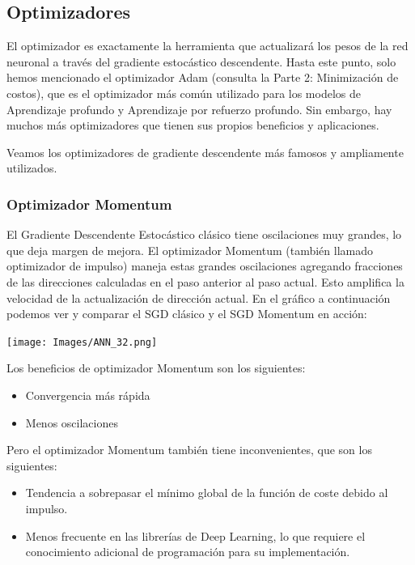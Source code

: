 \documentclass[
]{book}
\providecommand{\tightlist}{%
  \setlength{\itemsep}{0pt}\setlength{\parskip}{0pt}}
\begin{document}
\hypertarget{optimizadores}{%
\subsection{Optimizadores}\label{optimizadores}}

El optimizador es exactamente la herramienta que actualizará los pesos de la red neuronal a través del gradiente estocástico descendente. Hasta este punto, solo hemos mencionado el optimizador Adam (consulta la Parte 2: Minimización de costos), que es el optimizador más común utilizado para los modelos de Aprendizaje profundo y Aprendizaje por refuerzo profundo. Sin embargo, hay muchos más optimizadores que tienen sus propios beneficios y aplicaciones.

Veamos los optimizadores de gradiente descendente más famosos y ampliamente utilizados.

\hypertarget{optimizador-momentum}{%
\subsubsection{Optimizador Momentum}\label{optimizador-momentum}}

El Gradiente Descendente Estocástico clásico tiene oscilaciones muy grandes, lo que deja margen de mejora. El optimizador Momentum (también llamado optimizador de impulso) maneja estas grandes oscilaciones agregando fracciones de las direcciones calculadas en el paso anterior al paso actual. Esto amplifica la velocidad de la actualización de dirección actual. En el gráfico a continuación podemos ver y comparar el SGD clásico y el SGD Momentum en acción:

\texttt{[image: Images/ANN\_32.png]}

Los beneficios de optimizador Momentum son los siguientes:

\begin{itemize}
\tightlist
\item
  Convergencia más rápida
\item
  Menos oscilaciones
\end{itemize}

Pero el optimizador Momentum también tiene inconvenientes, que son los siguientes:

\begin{itemize}
\tightlist
\item
  Tendencia a sobrepasar el mínimo global de la función de coste debido al impulso.
\item
  Menos frecuente en las librerías de Deep Learning, lo que requiere el conocimiento adicional de programación para su implementación.
\end{itemize}
\end{document}
